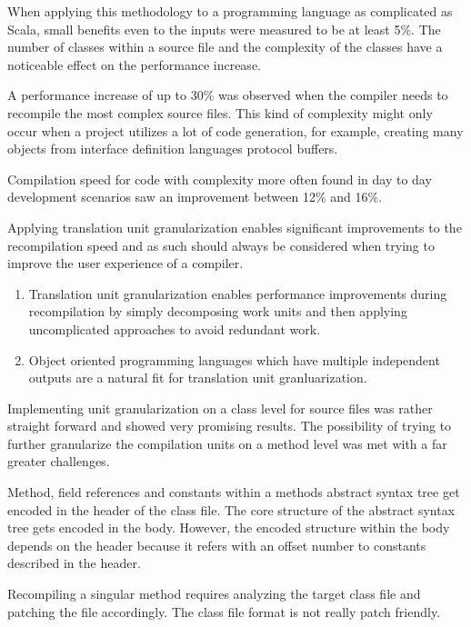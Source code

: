 \documentclass{VUMIFPSbakalaurinis}
\begin{document}
When applying this methodology to a programming language as complicated as Scala, small benefits even to the inputs were measured to be at least 5\%.
The number of classes within a source file and the complexity of the classes have a noticeable effect on the performance increase.

A performance increase of up to 30\% was observed when the compiler needs to recompile the most complex source files.
This kind of complexity might only occur when a project utilizes a lot of code generation, for example, creating many objects from interface definition languages protocol buffers.

Compilation speed for code with complexity more often found in day to day development scenarios saw an improvement between 12\% and 16\%.

Applying translation unit granularization enables significant improvements to the recompilation speed and as such should always be considered when trying to improve the user experience of a compiler.
\fi


\begin{enumerate}
\item{
	Translation unit granularization enables performance improvements during recompilation by simply decomposing work units and then applying uncomplicated approaches to avoid redundant work.
}
\item{
  Object oriented programming languages which have multiple independent outputs are a natural fit for translation unit granluarization.
}
\end{enumerate}

\iffalse
{}

Implementing unit granularization on a class level for source files was rather straight forward and showed very promising results.
The possibility of trying to further granularize the compilation units on a method level was met with a far greater challenges.

Method, field references and constants within a methods abstract syntax tree get encoded in the header of the class file.
The core structure of the abstract syntax tree gets encoded in the body.
However, the encoded structure within the body depends on the header because it refers with an offset number to constants described in the header.

Recompiling a singular method requires analyzing the target class file and patching the file accordingly.
The class file format is not really patch friendly.
\end{document}
